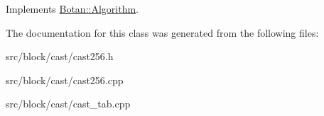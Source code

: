 Implements \hyperlink{classBotan_1_1Algorithm_a42d3ee39e051eba01ecace201fe1e6fd}{Botan\-::\-Algorithm}.



The documentation for this class was generated from the following files\-:\begin{DoxyCompactItemize}
\item 
src/block/cast/cast256.\-h\item 
src/block/cast/cast256.\-cpp\item 
src/block/cast/cast\-\_\-tab.\-cpp\end{DoxyCompactItemize}
